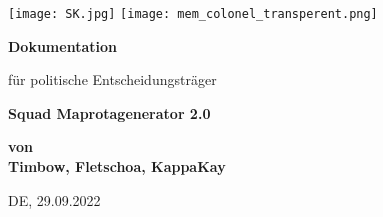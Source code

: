 \begin{titlepage}

    \texttt{[image: SK.jpg]}
    \hfill
    \texttt{[image: mem\_colonel\_transperent.png]}

    \begin{center}
        \vspace*{1cm}
        \Large
        \textbf{Dokumentation}

        \vspace*{0.5cm}
        \normalsize
        für politische Entscheidungsträger

        \vspace*{1cm}
        \huge
        \textbf{Squad Maprotagenerator 2.0}\\
        \vspace{0.5cm}
        

        \vspace{1.5cm}
        \Large
        \textbf{von}\\
        \textbf{Timbow, Fletschoa, KappaKay}

        \vspace{0.5cm}
        \normalsize

        \vspace{2cm}
        DE, 29.09.2022

        \vspace{1.3cm}

        \begin{tabular}{ccc}
             
        \end{tabular}
    \end{center}
\end{titlepage}